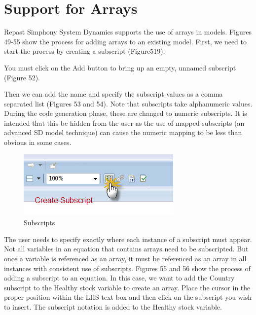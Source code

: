 \documentclass[11pt]{amsart}
\begin{document}
\section{Support for Arrays}
Repast Simphony System Dynamics supports the use of arrays in models. Figures 49-55 show the process for adding arrays to an existing model. First, we need to start the process by creating a subscript (Figure519).


You must click on the Add button to bring up an empty, unnamed subscript (Figure 52).


Then we can add the name and specify the subscript values as a comma separated list (Figures 53 and 54). Note that subscripts take alphanumeric values. During the code generation phase, these are changed to numeric subscripts. It is intended that this be hidden from the user as the use of mapped subscripts (an advanced SD model technique) can cause the numeric mapping to be less than obvious in some cases.


\begin{figure}[ht]
\begin{center}
\vspace{.2in}
\centerline {
\includegraphics[totalheight=0.3\textheight]{images/052.jpg}
}
\caption{Subscripts}
\label{fig:052}
\end{center}
\end{figure}

The user needs to specify exactly where each instance of a subscript must appear. Not all variables in an equation that contains arrays need to be subscripted. But once a variable is referenced as an array, it must be referenced as an array in all instances with consistent use of subscripts. Figures 55 and 56 show the process of adding a subscript to an equation. In this case, we want to add the Country subscript to the Healthy stock variable to create an array. Place the cursor in the proper position within the LHS text box and then click on the subscript you wish to insert. The subscript notation is added to the Healthy stock variable.
\end{document}
